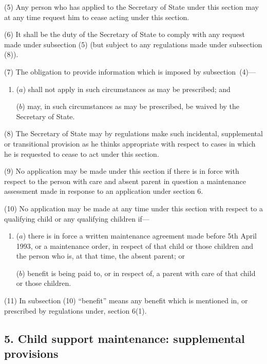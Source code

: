 \documentclass[12pt,a4paper]{article}
\begin{document}
(5) Any person who has applied to the Secretary of State under this section may at any time request him to cease acting under this section.

(6) It shall be the duty of the Secretary of State to comply with any request made under subsection (5)  (but subject to any regulations made under subsection (8)).

(7) The obligation to provide information which is imposed by subsection~(4)—
\begin{enumerate}\item[]
($a$) shall not apply in such circumstances as may be prescribed; and

($b$) may, in such circumstances as may be prescribed, be waived by the Secretary of State.
\end{enumerate}

(8) The Secretary of State may by regulations make such incidental, supplemental or transitional provision as he thinks appropriate with respect to cases in which he is requested to cease to act under this section.

(9) No application may be made under this section if there is in force with respect to the person with care and absent parent in question a maintenance assessment made in response to an application under section 6.

(10) No application may be made at any time under this section with respect to a qualifying child or any qualifying children if—
\begin{enumerate}\item[]
($a$) there is in force a written maintenance agreement made before 5th April 1993, or a maintenance order, in respect of that child or those children and the person who is, at that time, the absent parent; or

($b$) benefit is being paid to, or in respect of, a parent with care of that child or 
those children.
\end{enumerate}

(11) In subsection (10) “benefit” means any benefit which is mentioned in, or prescribed by regulations under, section 6(1).


\subsection{5. Child support maintenance: supplemental provisions}
\end{document}
